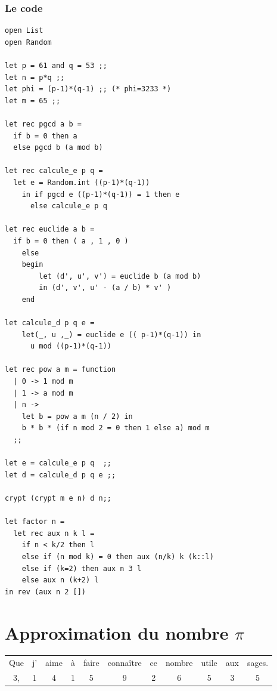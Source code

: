  \subsubsection{Le code}
 \begin{verbatim}
open List
open Random 

let p = 61 and q = 53 ;;
let n = p*q ;;
let phi = (p-1)*(q-1) ;; (* phi=3233 *)
let m = 65 ;;

let rec pgcd a b =
  if b = 0 then a 
  else pgcd b (a mod b)

let rec calcule_e p q =
  let e = Random.int ((p-1)*(q-1))
    in if pgcd e ((p-1)*(q-1)) = 1 then e
      else calcule_e p q  

let rec euclide a b = 
  if b = 0 then ( a , 1 , 0 ) 
    else 
    begin
        let (d', u', v') = euclide b (a mod b)
        in (d', v', u' - (a / b) * v' )
    end

let calcule_d p q e =
    let(_, u ,_) = euclide e (( p-1)*(q-1)) in
      u mod ((p-1)*(q-1))

let rec pow a m = function
  | 0 -> 1 mod m
  | 1 -> a mod m
  | n -> 
    let b = pow a m (n / 2) in
    b * b * (if n mod 2 = 0 then 1 else a) mod m
  ;;    

let e = calcule_e p q  ;;
let d = calcule_d p q e ;;

crypt (crypt m e n) d n;;

let factor n =
  let rec aux n k l =
    if n < k/2 then l
    else if (n mod k) = 0 then aux (n/k) k (k::l)
    else if (k=2) then aux n 3 l 
    else aux n (k+2) l
in rev (aux n 2 [])
\end{verbatim}

 \section{Approximation du nombre $\pi$ }

\begin{center}
	\begin{tabular}{ccccccccccc}
		Que & j'& aime & à & faire & connaître & ce & nombre & utile & aux & sages. \\
		3,   & 1 &  4   & 1 &  5    &  9        & 2  &  6     &  5    & 3   & 5 \\ 
	\end{tabular}	
\end{center}


